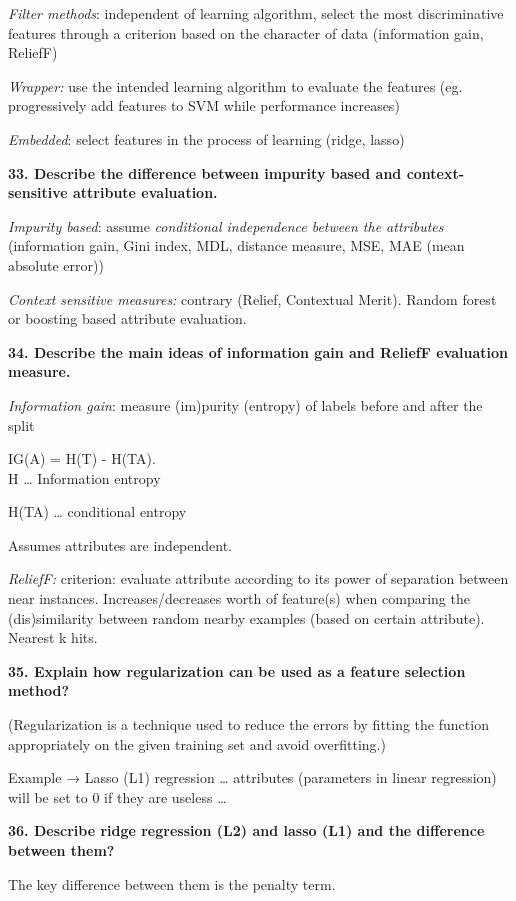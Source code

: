 \textit{Filter methods}: independent of learning algorithm, select
the most discriminative features through a criterion based on the
character of data (information gain, ReliefF)

\textit{Wrapper:} use the intended learning algorithm to evaluate the
features (eg. progressively add features to SVM while performance
increases)

\textit{Embedded}: select features in the process of learning (ridge,
lasso)

\textbf{33. Describe the difference between impurity based and
context-sensitive attribute evaluation.}

\textit{Impurity based}: assume \textit{conditional independence
between the attributes} (information gain, Gini index, MDL, distance
measure, MSE, MAE (mean absolute error))

\textit{Context sensitive measures:} contrary (Relief, Contextual
Merit). Random forest or boosting based attribute evaluation.

\textbf{34. Describe the main ideas of information gain and ReliefF
evaluation measure.}

\textit{Information gain}: measure (im)purity (entropy) of labels
before and after the split

IG(A) = H(T) - H(T\textbar A).\\
H \ldots{} Information entropy

H(T\textbar A) \ldots{} conditional entropy

Assumes attributes are independent.

\textit{ReliefF:} criterion: evaluate attribute according to its
power of separation between near instances. Increases/decreases worth of
feature(s) when comparing the (dis)similarity between random nearby
examples (based on certain attribute). Nearest k hits.

\textbf{35. Explain how regularization can be used as a feature
selection method?}

(Regularization is a technique used to reduce the errors by fitting the
function appropriately on the given training set and avoid overfitting.)

Example → Lasso (L1) regression \ldots{} attributes (parameters in
linear regression) will be set to 0 if they are useless \ldots{}

\textbf{36. Describe ridge regression (L2) and lasso (L1) and the
difference between them?}

The key difference between them is the penalty term.


